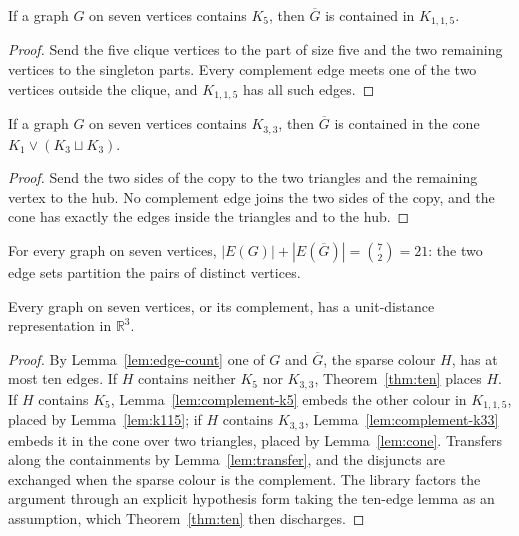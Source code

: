 \begin{lemma}
  \label{lem:complement-k5}
  \leanok
  If a graph $G$ on seven vertices contains $K_5$, then $\overline G$ is contained in
  $K_{1,1,5}$.
\end{lemma}
\begin{proof}
  Send the five clique vertices to the part of size five and the two remaining vertices to
  the singleton parts. Every complement edge meets one of the two vertices outside the
  clique, and $K_{1,1,5}$ has all such edges.
\end{proof}

\begin{lemma}
  \label{lem:complement-k33}
  \leanok
  If a graph $G$ on seven vertices contains $K_{3,3}$, then $\overline G$ is contained in the
  cone $K_1 \vee (K_3 \sqcup K_3)$.
\end{lemma}
\begin{proof}
  Send the two sides of the copy to the two triangles and the remaining vertex to the hub.
  No complement edge joins the two sides of the copy, and the cone has exactly the edges
  inside the triangles and to the hub.
\end{proof}

\begin{lemma}
  \label{lem:edge-count}
  \leanok
  For every graph on seven vertices, $|E(G)| + |E(\overline G)| = \binom72 = 21$: the two
  edge sets partition the pairs of distinct vertices.
\end{lemma}

\begin{theorem}
  \label{thm:seven}
  \leanok
  Every graph on seven vertices, or its complement, has a unit-distance representation in
  $\mathbb{R}^3$.
\end{theorem}
\begin{proof}
  By Lemma~\ref{lem:edge-count} one of $G$ and $\overline G$, the sparse colour $H$, has at
  most ten edges. If $H$ contains neither $K_5$ nor $K_{3,3}$, Theorem~\ref{thm:ten} places
  $H$. If $H$ contains $K_5$, Lemma~\ref{lem:complement-k5} embeds the other colour in
  $K_{1,1,5}$, placed by Lemma~\ref{lem:k115}; if $H$ contains $K_{3,3}$,
  Lemma~\ref{lem:complement-k33} embeds it in the cone over two triangles, placed by
  Lemma~\ref{lem:cone}. Transfers along the containments by Lemma~\ref{lem:transfer}, and
  the disjuncts are exchanged when the sparse colour is the complement. The library factors
  the argument through an explicit hypothesis form taking the ten-edge lemma as an
  assumption, which Theorem~\ref{thm:ten} then discharges.
\end{proof}

